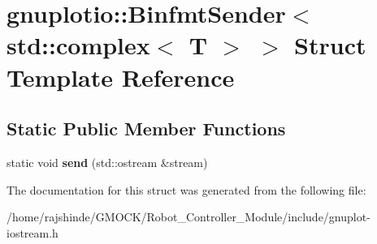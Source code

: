 \hypertarget{structgnuplotio_1_1_binfmt_sender_3_01std_1_1complex_3_01_t_01_4_01_4}{}\section{gnuplotio\+:\+:Binfmt\+Sender$<$ std\+:\+:complex$<$ T $>$ $>$ Struct Template Reference}
\label{structgnuplotio_1_1_binfmt_sender_3_01std_1_1complex_3_01_t_01_4_01_4}
\subsection*{Static Public Member Functions}
\begin{DoxyCompactItemize}
\item 
static void {\bfseries send} (std\+::ostream \&stream)\hypertarget{structgnuplotio_1_1_binfmt_sender_3_01std_1_1complex_3_01_t_01_4_01_4_a64633d068c93ef2822ee3aa6ef39d623}{}\label{structgnuplotio_1_1_binfmt_sender_3_01std_1_1complex_3_01_t_01_4_01_4_a64633d068c93ef2822ee3aa6ef39d623}

\end{DoxyCompactItemize}


The documentation for this struct was generated from the following file\+:\begin{DoxyCompactItemize}
\item 
/home/rajshinde/\+G\+M\+O\+C\+K/\+Robot\+\_\+\+Controller\+\_\+\+Module/include/gnuplot-\/iostream.\+h\end{DoxyCompactItemize}
